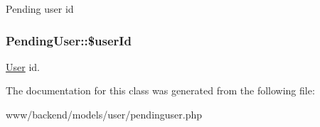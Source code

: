 \label{classPendingUser_a3555aa718d233a642bf6d72cf4f2b3b6}
Pending user id \hypertarget{classPendingUser_a059b78d9120ca9e3c497bc6860f39b03}{
\subsubsection[{\$userId}]{\setlength{\rightskip}{0pt plus 5cm}PendingUser::\$userId}}
\label{classPendingUser_a059b78d9120ca9e3c497bc6860f39b03}
\hyperlink{classUser}{User} id. 

The documentation for this class was generated from the following file:\begin{DoxyCompactItemize}
\item 
www/backend/models/user/pendinguser.php\end{DoxyCompactItemize}
